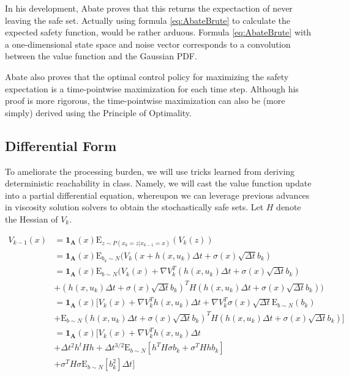 \documentclass[a4paper]{article}
\begin{document}
In his development, Abate proves that this returns the expectaction of never leaving the safe set.
Actually using formula \ref{eq:AbateBrute} to calculate the expected safety function, would be rather arduous.
Formula \ref{eq:AbateBrute} with a one-dimensional state space and noise vector corresponds to a convolution between the value function and the Gaussian PDF.

Abate also proves that the optimal control policy for maximizing the safety expectation is a time-pointwise maximization for each time step.
Although his proof is more rigorous, the time-pointwise maximization can also be (more simply) derived using the Principle of Optimality.

\subsection{Differential Form}
To ameliorate the processing burden, we will use tricks learned from deriving deterministic reachability in class.
Namely, we will cast the value function update into a partial differential equation, whereupon we can leverage previous advances in viscosity solution solvers to obtain the stochastically safe sets.
Let $H$ denote the Hessian of $V_k$.

\begin{align*}
V_{k-1}(x) & = \mathbf{1_A}(x) \mathrm{E}_{z \sim P(x_k = z | x_{k-1}=x)} (V_k(z))
\\ & = \mathbf{1_A}(x) \mathrm{E}_{b_k\sim N} (V_k( x + h(x,u_k) \Delta t + \sigma(x) \sqrt{\Delta t} b_k )
\\ & = \mathbf{1_A}(x) \mathrm{E}_{b\sim N} (V_k( x ) + \nabla V_k^T (h(x,u_k) \Delta t + \sigma(x) \sqrt{\Delta t} b_k)
\\ & + (h(x,u_k) \Delta t + \sigma(x) \sqrt{\Delta t} b_k)^T H (h(x,u_k) \Delta t + \sigma(x) \sqrt{\Delta t} b_k)    )
\\ & = \mathbf{1_A}(x) [ V_k( x ) + \nabla V_k^T h(x,u_k) \Delta t + \nabla V_k^T \sigma(x) \sqrt{\Delta t} \mathrm{E}_{b\sim N}(b_k)
\\ & + \mathrm{E}_{b\sim N} (h(x,u_k) \Delta t + \sigma(x) \sqrt{\Delta t} b_k)^T H (h(x,u_k) \Delta t + \sigma(x) \sqrt{\Delta t} b_k) ]
\\ & = \mathbf{1_A}(x) [ V_k( x ) + \nabla V_k^T h(x,u_k) \Delta t
\\ & + \Delta t^2 h^t H h + \Delta t^{3/2} \mathrm{E}_{b\sim N} [ h^T H \sigma b_k + \sigma^T H h b_k]
\\ & + \sigma^T H \sigma \mathrm{E}_{b\sim N} [b_k^2] \Delta t ]
\end{align*}
\end{document}

